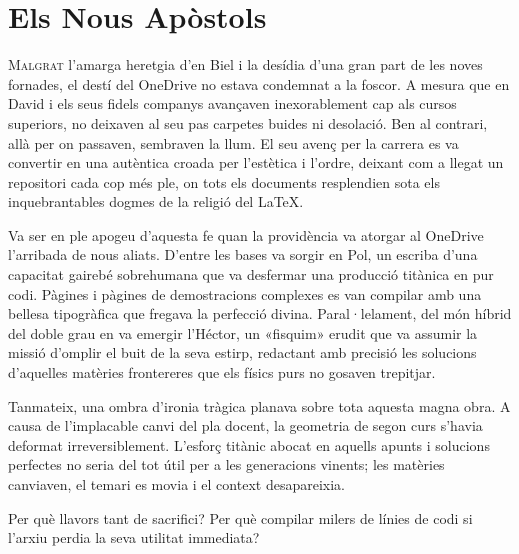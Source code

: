 \chapter{Els Nous Apòstols}


\lettrine[loversize=0.2, lines=2]{M}{algrat} l'amarga heretgia d'en Biel i la desídia d'una gran part de les noves fornades, el destí del OneDrive no estava condemnat a la foscor. A mesura que en David i els seus fidels companys avançaven inexorablement cap als cursos superiors, no deixaven al seu pas carpetes buides ni desolació. Ben al contrari, allà per on passaven, sembraven la llum. El seu avenç per la carrera es va convertir en una autèntica croada per l'estètica i l'ordre, deixant com a llegat un repositori cada cop més ple, on tots els documents resplendien sota els inquebrantables dogmes de la religió del LaTeX.

Va ser en ple apogeu d'aquesta fe quan la providència va atorgar al OneDrive l'arribada de nous aliats. D'entre les bases va sorgir en Pol, un escriba d'una capacitat gairebé sobrehumana que va desfermar una producció titànica en pur codi. Pàgines i pàgines de demostracions complexes es van compilar amb una bellesa tipogràfica que fregava la perfecció divina. Paral·lelament, del món híbrid del doble grau en va emergir l'Héctor, un «fisquim» erudit que va assumir la missió d'omplir el buit de la seva estirp, redactant amb precisió les solucions d'aquelles matèries frontereres que els físics purs no gosaven trepitjar.

Tanmateix, una ombra d'ironia tràgica planava sobre tota aquesta magna obra. A causa de l'implacable canvi del pla docent, la geometria de segon curs s'havia deformat irreversiblement. L'esforç titànic abocat en aquells apunts i solucions perfectes no seria del tot útil per a les generacions vinents; les matèries canviaven, el temari es movia i el context desapareixia.

Per què llavors tant de sacrifici? Per què compilar milers de línies de codi si l'arxiu perdia la seva utilitat immediata?

